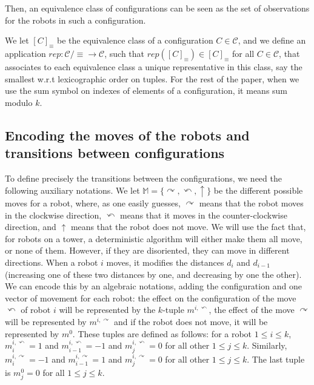 \documentclass[envcountsame]{llncs} \usepackage[english]{babel}
\newcommand{\equivclass}[1]{[#1]_\equiv}
\newcommand{\Act}{\ensuremath{\mathbb{M}}}
\newcommand{\Config}{\ensuremath{\mathcal{C}}}
\newcommand{\rep}{\ensuremath{\mathit{rep}}}
\newcommand{\clockwise}{\ensuremath{\curvearrowright}}
\newcommand{\counterclockwise}{\ensuremath{\curvearrowleft}}
\newcommand{\still}{\ensuremath{\uparrow}}
\begin{document}
Then, an equivalence class of configurations can be seen as the set of observations for the robots in such a configuration.

We let $\equivclass{C}$ be the equivalence class of a configuration $C\in\Config$, and
we define an application $\rep:{\Config/\equiv} \rightarrow \Config$, such that 
 $\rep(\equivclass{C})\in \equivclass{C}$ for all $C\in\Config$, that associates to each 
 equivalence class a unique representative in this class, say the smallest w.r.t lexicographic order on tuples. 
For the rest of the paper, when we use the sum symbol on indexes of elements of a configuration, it means sum modulo $k$.

\subsection{Encoding the moves of the robots and transitions between configurations}\label{subsec:moves}
To define precisely the transitions between the configurations, we need the following auxiliary notations.
 We  let $\Act=\{\clockwise,\counterclockwise, \still\}$ be the different possible moves for a robot, where, as one easily 
 guesses, $\clockwise$ means that the robot moves in the clockwise direction, $\counterclockwise$ means that it moves in 
 the counter-clockwise direction, and $\still$ means that the robot does not move.
 We will use the fact that,
 for robots on a tower, a deterministic algorithm will either make them all move, or none of them. However, if they are disoriented, they
 can move in different directions.
 When a robot $i$ moves, it modifies the distances $d_i$ and $d_{i-1}$ (increasing one of these two distances by one, and
 decreasing by one the other). We can encode this by an algebraic notations, adding the configuration and one
 vector of movement for each robot: the effect on the configuration of the move $\counterclockwise$ of robot $i$ will be represented 
by the $k$-tuple $m^{i,\counterclockwise}$, the effect of the move $\clockwise$ will be represented by $m^{i,\clockwise}$ 
and if the robot does not move, it will be represented by $m^{0}$. 
These tuples are defined as follows: for a robot $1\leq i\leq k$,
$m^{i,\counterclockwise}_i=1$ and $m^{i,\counterclockwise}_{i-1}=-1$ and $m^{i,\counterclockwise}_j=0$ for all other $1\leq j\leq k$. Similarly,
$m^{i,\clockwise}_i=-1$ and $m^{i,\clockwise}_{i-1}=1$ and $m^{i,\clockwise}_j=0$ for all other $1\leq j\leq k$. The last tuple is $m^{0}_j=0$ for all 
$1\leq j\leq k$.
\end{document}
